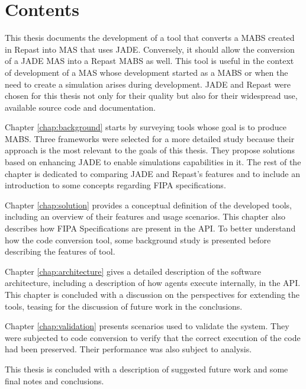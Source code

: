 
\section{Contents}

This thesis documents the development of a tool that converts a MABS created in Repast into MAS that uses JADE. Conversely, it should allow the conversion of a JADE MAS into a Repast MABS as well. This tool is useful in the context of development of a MAS whose development started as a MABS or when the need to create a simulation arises during development. JADE and Repast were chosen for this thesis not only for their quality but also for their widespread use, available source code and documentation.

Chapter \ref{chap:background} starts by surveying tools whose goal is to produce MABS. Three frameworks were selected for a more detailed study because their approach is the most relevant to the goals of this thesis. They propose solutions based on enhancing JADE to enable simulations capabilities in it. The rest of the chapter is dedicated to comparing JADE and Repast's features and to include an introduction to some concepts regarding FIPA specifications.

Chapter \ref{chap:solution} provides a conceptual definition of the developed tools, including an overview of their features and usage scenarios. This chapter also describes how FIPA Specifications are present in the API. To better understand how the code conversion tool, some background study is presented before describing the features of tool.

Chapter \ref{chap:architecture} gives a detailed description of the software architecture, including a description of how agents execute internally, in the API. This chapter is concluded with a discussion on the perspectives for extending the tools, teasing for the discussion of future work in the conclusions.

Chapter \ref{chap:validation} presents scenarios used to validate the system. They were subjected to code conversion to verify that the correct execution of the code had been preserved. Their performance was also subject to analysis.

This thesis is concluded with a description of suggested future work and some final notes and conclusions.